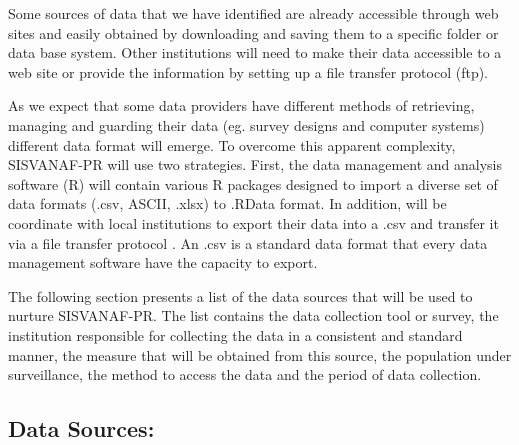 \documentclass[12pt,letterpaper]{report}
\begin{document}
Some sources of data that we have identified are already accessible through web sites and easily obtained by downloading and saving them to a specific folder or data base system. Other institutions will need to make their data accessible to a web site or provide the information by setting up a file transfer protocol (ftp).

As we expect that some data providers have different methods of retrieving, managing and guarding their data (eg. survey designs and computer systems) different data format will emerge. To overcome this apparent complexity, SISVANAF-PR will use two strategies. First, the data management and analysis software (R) will contain various R packages designed to import a diverse set of data formats (.csv, ASCII, .xlsx) to .RData format. In addition, will be coordinate with local institutions to export their data into a .csv and transfer it via a file transfer protocol .  An .csv is a standard data format that every data management software have the capacity to export.

The following section presents a list of the data sources that will be used to nurture SISVANAF-PR. The list contains the data collection tool or survey, the institution responsible for collecting the data in a consistent and standard manner, the measure that will be obtained from this source, the population under surveillance, the method to access the data and the period of data collection.

\subsection{Data Sources:}
\end{document}

